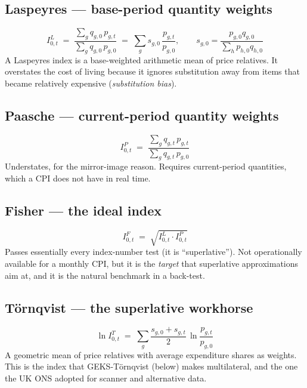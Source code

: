 \subsection{Laspeyres --- base-period quantity weights}
\begin{equation}
I^{L}_{0,t} \;=\; \frac{\sum_g q_{g,0}\,p_{g,t}}{\sum_g q_{g,0}\,p_{g,0}}
\;=\; \sum_g s_{g,0}\,\frac{p_{g,t}}{p_{g,0}},
\qquad s_{g,0} = \frac{p_{g,0}q_{g,0}}{\sum_h p_{h,0}q_{h,0}}
\end{equation}
A Laspeyres index is a base-weighted arithmetic mean of price relatives. It overstates the
cost of living because it ignores substitution away from items that became relatively
expensive (\emph{substitution bias}).

\subsection{Paasche --- current-period quantity weights}
\begin{equation}
I^{P}_{0,t} \;=\; \frac{\sum_g q_{g,t}\,p_{g,t}}{\sum_g q_{g,t}\,p_{g,0}}
\end{equation}
Understates, for the mirror-image reason. Requires current-period quantities, which a CPI
does not have in real time.

\subsection{Fisher --- the ideal index}
\begin{equation}
I^{F}_{0,t} \;=\; \sqrt{I^{L}_{0,t}\cdot I^{P}_{0,t}}
\end{equation}
Passes essentially every index-number test (it is ``superlative''). Not operationally
available for a monthly CPI, but it is the \emph{target} that superlative approximations
aim at, and it is the natural benchmark in a back-test.

\subsection{T\"ornqvist --- the superlative workhorse}
\begin{equation}
\ln I^{T}_{0,t} \;=\; \sum_g \frac{s_{g,0}+s_{g,t}}{2}\,\ln\!\frac{p_{g,t}}{p_{g,0}}
\end{equation}
A geometric mean of price relatives with average expenditure shares as weights. This is the
index that GEKS-T\"ornqvist (below) makes multilateral, and the one the UK ONS adopted for
scanner and alternative data.

